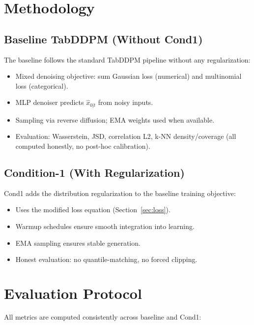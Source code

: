 \documentclass{article}
\begin{document}
\section{Methodology}

\subsection{Baseline TabDDPM (Without Cond1)}

The baseline follows the standard TabDDPM pipeline without any regularization:

\begin{itemize}
  \item Mixed denoising objective: sum Gaussian loss (numerical) and multinomial loss (categorical).
  \item MLP denoiser predicts $\hat{x}_{0|t}$ from noisy inputs.
  \item Sampling via reverse diffusion; EMA weights used when available.
  \item Evaluation: Wasserstein, JSD, correlation L2, k-NN density/coverage (all computed honestly, no post-hoc calibration).
\end{itemize}

\subsection{Condition-1 (With Regularization)}

Cond1 adds the distribution regularization to the baseline training objective:

\begin{itemize}
  \item Uses the modified loss equation (Section~\ref{sec:loss}).
  \item Warmup schedules ensure smooth integration into learning.
  \item EMA sampling ensures stable generation.
  \item Honest evaluation: no quantile-matching, no forced clipping.
\end{itemize}

\section{Evaluation Protocol}

All metrics are computed consistently across baseline and Cond1:
\end{document}
